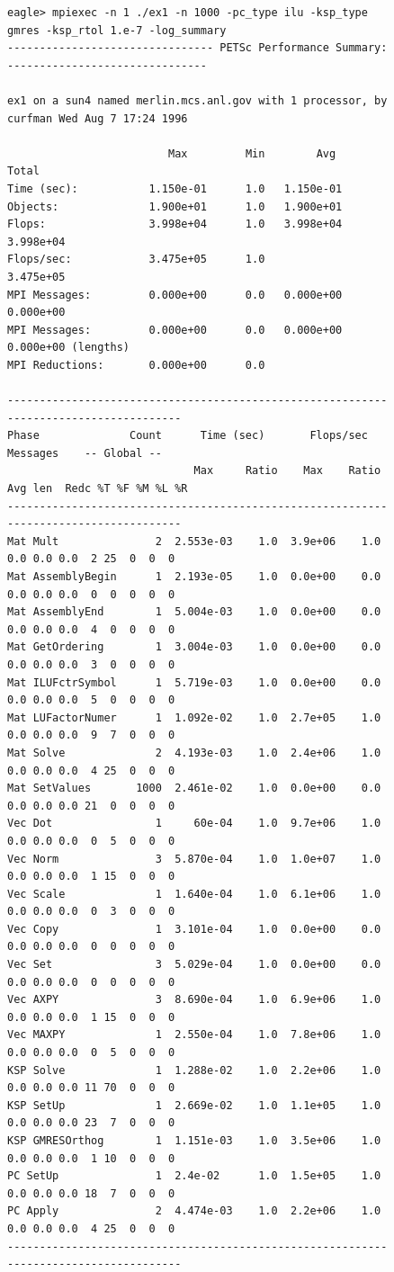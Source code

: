 \begin{figure}[H]
{\footnotesize
\begin{verbatim}
eagle> mpiexec -n 1 ./ex1 -n 1000 -pc_type ilu -ksp_type gmres -ksp_rtol 1.e-7 -log_summary
-------------------------------- PETSc Performance Summary: -------------------------------

ex1 on a sun4 named merlin.mcs.anl.gov with 1 processor, by curfman Wed Aug 7 17:24 1996

                         Max         Min        Avg        Total
Time (sec):           1.150e-01      1.0   1.150e-01
Objects:              1.900e+01      1.0   1.900e+01
Flops:                3.998e+04      1.0   3.998e+04  3.998e+04
Flops/sec:            3.475e+05      1.0              3.475e+05
MPI Messages:         0.000e+00      0.0   0.000e+00  0.000e+00
MPI Messages:         0.000e+00      0.0   0.000e+00  0.000e+00 (lengths)
MPI Reductions:       0.000e+00      0.0

--------------------------------------------------------------------------------------
Phase              Count      Time (sec)       Flops/sec     Messages    -- Global --
                             Max     Ratio    Max    Ratio Avg len  Redc %T %F %M %L %R
--------------------------------------------------------------------------------------
Mat Mult               2  2.553e-03    1.0  3.9e+06    1.0  0.0 0.0 0.0  2 25  0  0  0
Mat AssemblyBegin      1  2.193e-05    1.0  0.0e+00    0.0  0.0 0.0 0.0  0  0  0  0  0
Mat AssemblyEnd        1  5.004e-03    1.0  0.0e+00    0.0  0.0 0.0 0.0  4  0  0  0  0
Mat GetOrdering        1  3.004e-03    1.0  0.0e+00    0.0  0.0 0.0 0.0  3  0  0  0  0
Mat ILUFctrSymbol      1  5.719e-03    1.0  0.0e+00    0.0  0.0 0.0 0.0  5  0  0  0  0
Mat LUFactorNumer      1  1.092e-02    1.0  2.7e+05    1.0  0.0 0.0 0.0  9  7  0  0  0
Mat Solve              2  4.193e-03    1.0  2.4e+06    1.0  0.0 0.0 0.0  4 25  0  0  0
Mat SetValues       1000  2.461e-02    1.0  0.0e+00    0.0  0.0 0.0 0.0 21  0  0  0  0
Vec Dot                1     60e-04    1.0  9.7e+06    1.0  0.0 0.0 0.0  0  5  0  0  0
Vec Norm               3  5.870e-04    1.0  1.0e+07    1.0  0.0 0.0 0.0  1 15  0  0  0
Vec Scale              1  1.640e-04    1.0  6.1e+06    1.0  0.0 0.0 0.0  0  3  0  0  0
Vec Copy               1  3.101e-04    1.0  0.0e+00    0.0  0.0 0.0 0.0  0  0  0  0  0
Vec Set                3  5.029e-04    1.0  0.0e+00    0.0  0.0 0.0 0.0  0  0  0  0  0
Vec AXPY               3  8.690e-04    1.0  6.9e+06    1.0  0.0 0.0 0.0  1 15  0  0  0
Vec MAXPY              1  2.550e-04    1.0  7.8e+06    1.0  0.0 0.0 0.0  0  5  0  0  0
KSP Solve              1  1.288e-02    1.0  2.2e+06    1.0  0.0 0.0 0.0 11 70  0  0  0
KSP SetUp              1  2.669e-02    1.0  1.1e+05    1.0  0.0 0.0 0.0 23  7  0  0  0
KSP GMRESOrthog        1  1.151e-03    1.0  3.5e+06    1.0  0.0 0.0 0.0  1 10  0  0  0
PC SetUp               1  2.4e-02      1.0  1.5e+05    1.0  0.0 0.0 0.0 18  7  0  0  0
PC Apply               2  4.474e-03    1.0  2.2e+06    1.0  0.0 0.0 0.0  4 25  0  0  0
--------------------------------------------------------------------------------------


\end{verbatim}}
\end{figure}
